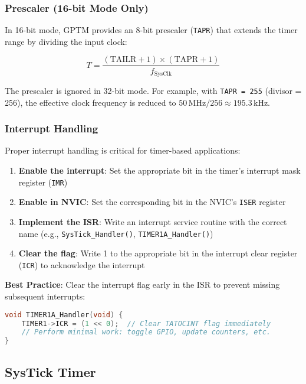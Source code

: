 \subsubsection{Prescaler (16-bit Mode Only)}

In 16-bit mode, GPTM provides an 8-bit prescaler (\texttt{TAPR}) that extends the timer range by dividing the input clock:

\[
T = \frac{(\text{TAILR} + 1) \times (\text{TAPR} + 1)}{f_{\text{SysClk}}}
\]

\noindent
The prescaler is ignored in 32-bit mode. For example, with \texttt{TAPR = 255} (divisor = 256), the effective clock frequency is reduced to $50\,\text{MHz} / 256 \approx 195.3\,\text{kHz}$.

\subsubsection{Interrupt Handling}

Proper interrupt handling is critical for timer-based applications:

\begin{enumerate}[nosep]
  \item \textbf{Enable the interrupt}: Set the appropriate bit in the timer's interrupt mask register (\texttt{IMR})
  \item \textbf{Enable in NVIC}: Set the corresponding bit in the NVIC's \texttt{ISER} register
  \item \textbf{Implement the ISR}: Write an interrupt service routine with the correct name (e.g., \texttt{SysTick\_Handler()}, \texttt{TIMER1A\_Handler()})
  \item \textbf{Clear the flag}: Write 1 to the appropriate bit in the interrupt clear register (\texttt{ICR}) to acknowledge the interrupt
\end{enumerate}

\noindent
\textbf{Best Practice}: Clear the interrupt flag early in the ISR to prevent missing subsequent interrupts:

\begin{lstlisting}[language=C]
void TIMER1A_Handler(void) {
    TIMER1->ICR = (1 << 0);  // Clear TATOCINT flag immediately
    // Perform minimal work: toggle GPIO, update counters, etc.
}
\end{lstlisting}
\subsection{SysTick Timer}

